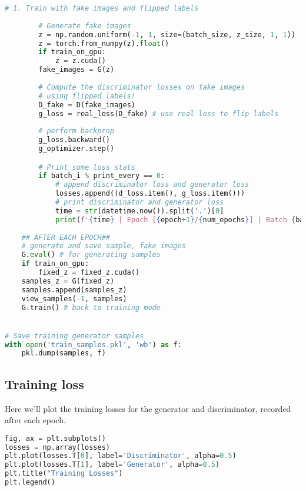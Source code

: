 \begin{lstlisting}[language=Python]
        # 1. Train with fake images and flipped labels
        
        # Generate fake images
        z = np.random.uniform(-1, 1, size=(batch_size, z_size, 1, 1))
        z = torch.from_numpy(z).float()
        if train_on_gpu:
            z = z.cuda()
        fake_images = G(z)
        
        # Compute the discriminator losses on fake images 
        # using flipped labels!
        D_fake = D(fake_images)
        g_loss = real_loss(D_fake) # use real loss to flip labels
        
        # perform backprop
        g_loss.backward()
        g_optimizer.step()

        # Print some loss stats
        if batch_i % print_every == 0:
            # append discriminator loss and generator loss
            losses.append((d_loss.item(), g_loss.item()))
            # print discriminator and generator loss
            time = str(datetime.now()).split('.')[0]
            print(f'{time} | Epoch [{epoch+1}/{num_epochs}] | Batch {batch_i}/{len(train_loader)} | d_loss: {d_loss.item():.4f} | g_loss: {g_loss.item():.4f}')
    
    ## AFTER EACH EPOCH##    
    # generate and save sample, fake images
    G.eval() # for generating samples
    if train_on_gpu:
        fixed_z = fixed_z.cuda()
    samples_z = G(fixed_z)
    samples.append(samples_z)
    view_samples(-1, samples)
    G.train() # back to training mode


# Save training generator samples
with open('train_samples.pkl', 'wb') as f:
    pkl.dump(samples, f)
\end{lstlisting}

\subsection{Training loss}

Here we'll plot the training losses for the generator and discriminator,
recorded after each epoch.

\begin{lstlisting}[language=Python]
fig, ax = plt.subplots()
losses = np.array(losses)
plt.plot(losses.T[0], label='Discriminator', alpha=0.5)
plt.plot(losses.T[1], label='Generator', alpha=0.5)
plt.title("Training Losses")
plt.legend()
\end{lstlisting}
